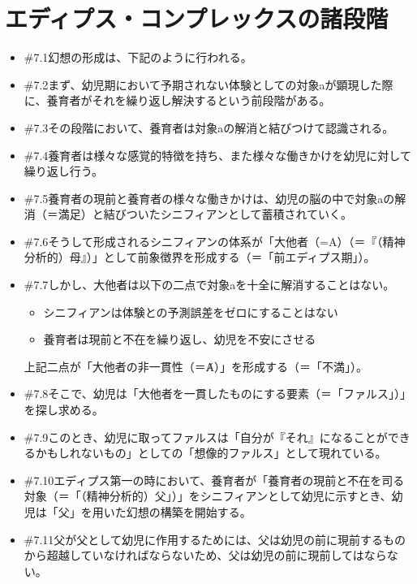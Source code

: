 \section{エディプス・コンプレックスの諸段階}\label{ux30a8ux30c7ux30a3ux30d7ux30b9ux30b3ux30f3ux30d7ux30ecux30c3ux30afux30b9ux306eux8af8ux6bb5ux968e}

\begin{note}{}
  \begin{itemize}
    \tightlist
    \item{\#7.1}幻想の形成は、下記のように行われる。
    \item{\#7.2}まず、幼児期において予期されない体験としての対象aが顕現した際に、養育者がそれを繰り返し解決するという前段階がある。
    \item{\#7.3}その段階において、養育者は対象aの解消と結びつけて認識される。
    \item{\#7.4}養育者は様々な感覚的特徴を持ち、また様々な働きかけを幼児に対して繰り返し行う。
    \item{\#7.5}養育者の現前と養育者の様々な働きかけは、幼児の脳の中で対象aの解消（＝満足）と結びついたシニフィアンとして蓄積されていく。
    \item{\#7.6}そうして形成されるシニフィアンの体系が「大他者（=A）（＝『（精神分析的）母』）」として前象徴界を形成する（＝「前エディプス期」）。
    \item{\#7.7}しかし、大他者は以下の二点で対象aを十全に解消することはない。
      \begin{itemize}
        \tightlist
        \item シニフィアンは体験との予測誤差をゼロにすることはない
        \item 養育者は現前と不在を繰り返し、幼児を不安にさせる
      \end{itemize}上記二点が「大他者の非一貫性（＝Ⱥ）」を形成する（＝「不満」）。
    \item{\#7.8}そこで、幼児は「大他者を一貫したものにする要素（＝「ファルス」）」を探し求める。
    \item{\#7.9}このとき、幼児に取ってファルスは「自分が『それ』になることができるかもしれないもの」としての「想像的ファルス」として現れている。
    \item{\#7.10}エディプス第一の時において、養育者が「養育者の現前と不在を司る対象（＝「（精神分析的）父」）」をシニフィアンとして幼児に示すとき、幼児は「父」を用いた幻想の構築を開始する。
    \item{\#7.11}父が父として幼児に作用するためには、父は幼児の前に現前するものから超越していなければならないため、父は幼児の前に現前してはならない。

\end{itemize}
\end{note}
